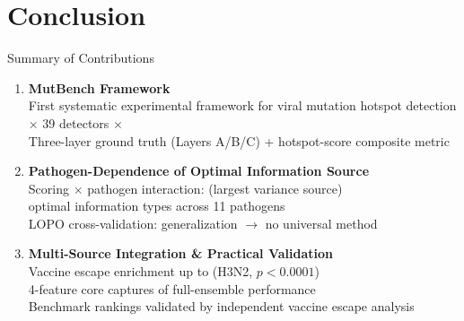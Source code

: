 \section{Conclusion}

\begin{frame}{Summary of Contributions}
  \begin{enumerate}
    \item \textbf{MutBench Framework} \\
      First systematic experimental framework for viral mutation hotspot detection \\
       $\times$ 39 detectors $\times$  \\
      Three-layer ground truth (Layers A/B/C) + hotspot-score composite metric

    \vspace{0.5em}
    \item \textbf{Pathogen-Dependence of Optimal Information Source} \\
      Scoring $\times$ pathogen interaction:  (largest variance source) \\
       optimal information types across 11 pathogens \\
      LOPO cross-validation:  generalization $\rightarrow$ no universal method

    \vspace{0.5em}
    \item \textbf{Multi-Source Integration \& Practical Validation} \\
      Vaccine escape enrichment up to  (H3N2, $p < 0.0001$) \\
      4-feature core captures  of full-ensemble performance \\
      Benchmark rankings validated by independent vaccine escape analysis
  \end{enumerate}
\end{frame}

